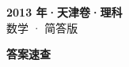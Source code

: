 \documentclass[zihao=-4, a4paper]{ctexart}
\begin{document}
\begin{center}
  {\Large\bfseries 2013 年·天津卷·理科}\\[4pt]
  {\large 数学 · 简答版}
\end{center}
\medskip
{}

\clearpage
{}
\begin{center}{\Large\bfseries 答案速查}\end{center}
\medskip

\end{document}
